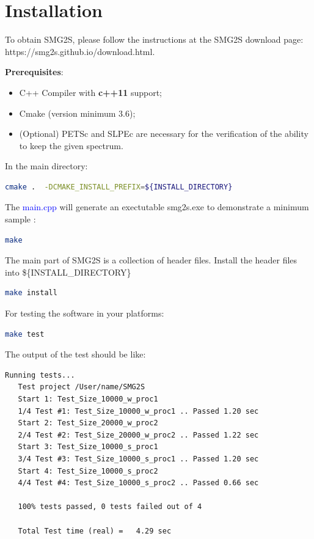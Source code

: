 \documentclass[a4paper, 10 pt]{report}
\begin{document}
	\section{Installation}
	To obtain SMG2S, please follow the instructions at the SMG2S download page: https://smg2s.github.io/download.html.
	
	\textbf{Prerequisites}:
	
	\begin{itemize}
		\item C++ Compiler with \textbf{c++11} support;
		\item Cmake (version minimum 3.6);
		\item (Optional) PETSc and SLPEc are necessary for the verification of the ability to keep the given spectrum.
	\end{itemize}
	
	In the main directory:
	
	\begin{lstlisting}[language=bash,frame=single]
   cmake .  -DCMAKE_INSTALL_PREFIX=${INSTALL_DIRECTORY}
	\end{lstlisting}
	
	The \textcolor{blue}{main.cpp} will generate an exectutable smg2s.exe to demonstrate a minimum sample :

	\begin{lstlisting}[language=bash, frame=single]
   make
	\end{lstlisting}

	    The main part of SMG2S is a collection of header files. Install the header files into \$\{INSTALL\_DIRECTORY\}
	    
	\begin{lstlisting}[language=bash,frame=single]
   make install
	\end{lstlisting}

	For testing the software in your platforms:
	
	\begin{lstlisting}[language=bash,frame=single]
   make test
	\end{lstlisting}
	
	The output of the test should be like:
\begin{lstlisting}[frame=single]
   Running tests...
   Test project /User/name/SMG2S
   Start 1: Test_Size_10000_w_proc1
   1/4 Test #1: Test_Size_10000_w_proc1 .. Passed 1.20 sec
   Start 2: Test_Size_20000_w_proc2
   2/4 Test #2: Test_Size_20000_w_proc2 .. Passed 1.22 sec
   Start 3: Test_Size_10000_s_proc1
   3/4 Test #3: Test_Size_10000_s_proc1 .. Passed 1.20 sec
   Start 4: Test_Size_10000_s_proc2
   4/4 Test #4: Test_Size_10000_s_proc2 .. Passed 0.66 sec

   100% tests passed, 0 tests failed out of 4

   Total Test time (real) =   4.29 sec
\end{lstlisting}
\end{document}
